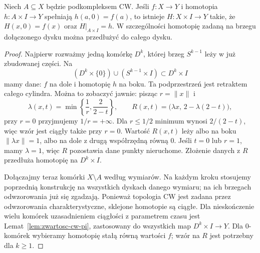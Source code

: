 \begin{lemat}
\label{lem:hep-cw}
Niech $A\subseteq X$ będzie podkompleksem
CW. Jeśli $f:X\to Y$ i homotopia
$h:A\times I\to Y$ spełniają
$h(a,0)=f(a)$, to istnieje
$H:X\times I\to Y$ takie, że
$H(x,0)=f(x)$ oraz $H|_{A\times I}=h$.
W szczególności homotopię
zadaną na brzegu dołączonego
dysku można przedłużyć do
całego dysku.
\end{lemat}
\begin{proof}
Najpierw rozważmy jedną komórkę
$D^k$, której brzeg $S^{k-1}$
leży w już zbudowanej części.
Na
\[
 (D^k\times\{0\})\cup
 (S^{k-1}\times I)
\subset D^k\times I
\]
mamy dane: $f$ na dole
i homotopię $h$ na boku.
Ta podprzestrzeń jest
retraktem całego cylindra.
Można to zobaczyć jawnie:
pisząc $r=\|x\|$ i
\[
 \lambda(x,t)=
 \min\left\{\frac1r,\frac2{2-t}\right\},
 \qquad
 R(x,t)=\bigl(\lambda x,\,
                  2-\lambda(2-t)\bigr),
\]
przy $r=0$ przyjmujemy
$1/r=+\infty$. Dla $r\leq1/2$ minimum wynosi $2/(2-t)$,
więc wzór jest ciągły także przy $r=0$. Wartość
$R(x,t)$ leży albo na boku
$\|\lambda x\|=1$, albo
na dole z drugą współrzędną
równą $0$. Jeśli $t=0$
lub $r=1$, mamy $\lambda=1$,
więc $R$ pozostawia dane
punkty nieruchome.
Złożenie danych z $R$
przedłuża homotopię
na $D^k\times I$.

Dołączajmy teraz komórki
$X\setminus A$ według
wymiarów. Na każdym kroku
stosujemy poprzednią
konstrukcję na wszystkich
dyskach danego wymiaru;
na ich brzegach odwzorowania
już się zgadzają. Ponieważ
topologia CW jest zadana
przez odwzorowania charakterystyczne,
sklejone homotopie są
ciągłe. Dla nieskończenie wielu komórek uzasadnieniem ciągłości
z parametrem czasu jest Lemat~\ref{lem:zwartosc-cw-pi},
zastosowany do wszystkich map $D^k\times I\to Y$.
Dla $0$-komórek wybieramy homotopię stałą równą wartości $f$;
wzór na $R$ jest potrzebny dla $k\geq1$.
\end{proof}

